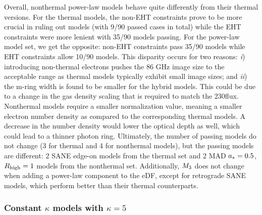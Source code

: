 Overall, \hamr nonthermal power-law models behave quite differently from their thermal versions.
For the thermal models, the non-EHT constraints prove to be more crucial in ruling out models (with 9/90 passed cases in total) while the EHT constraints were more lenient with 35/90 models passing.
For the power-law model set, we get the opposite: non-EHT constraints pass 35/90 models while EHT constraints allow 10/90 models.
This disparity occurs for two reasons:
\emph{i}) introducing non-thermal electrons pushes the 86 GHz image size to the acceptable range as thermal models typically exhibit small image sizes; and
\emph{ii}) the m-ring width is found to be smaller for the hybrid models.
This could be due to a change in the gas density scaling that is required to match the 230\GHz flux.
Nonthermal models require a smaller normalization value, meaning a smaller electron number density as compared to the corresponding thermal models.
A decrease in the number density would lower the optical depth as well, which could lead to a thinner photon ring.
Ultimately, the number of passing models do not change (3 for thermal and 4 for nonthermal models), but the passing models are different: 2 SANE edge-on models from the thermal set and 2 MAD $a_*=0.5$, $R_\mathrm{high}=1$ models from the nonthermal set.
Additionally, $M_{3}$ does not change when adding a power-law component to the eDF, except for retrograde SANE models, which perform better than their thermal counterparts.

\subsubsection{Constant \texorpdfstring{$\kappa$}{kappa} models with \texorpdfstring{$\kappa = 5$}{kappa = 5}}
\label{sec:constant_kappa}

